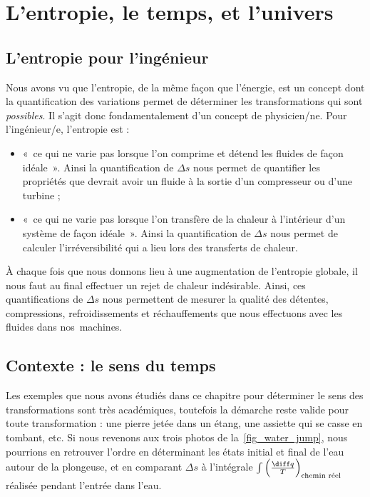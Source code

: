 \onlyframabook{\clearpage}
\section{L’entropie, le temps, et l’univers}

	\subsection{L’entropie pour l’ingénieur}

		Nous avons vu que l’entropie, de la même façon que l’énergie, est un concept dont la quantification des variations permet de déterminer les transformations qui sont \emph{possibles}. Il s’agit donc fondamentalement d’un concept de physicien/ne. Pour l’ingénieur/e, l’entropie est :
		\begin{itemize}
			\item «~ce qui ne varie pas lorsque l’on comprime et détend les fluides de façon idéale~». Ainsi la quantification de $\Delta s$ nous permet de quantifier les propriétés que devrait avoir un fluide à la sortie d’un compresseur ou d’une turbine ;
			\item «~ce qui ne varie pas lorsque l’on transfère de la chaleur à l’intérieur d’un système de façon idéale~». Ainsi la quantification de $\Delta s$ nous permet de calculer l’irréversibilité qui a lieu lors des transferts de chaleur.
		\end{itemize}

	À chaque fois que nous donnons lieu à une augmentation de l’entropie globale, il nous faut au final effectuer un rejet de chaleur indésirable. Ainsi, ces quantifications de $\Delta s$ nous permettent de mesurer la qualité des détentes, compressions, refroidissements et réchauffements que nous effectuons avec les fluides dans nos~machines.

	\subsection{Contexte : le sens du temps}
				
		Les exemples que nous avons étudiés dans ce chapitre pour déterminer le sens des transformations sont très académiques, toutefois la démarche reste valide pour toute transformation : une pierre jetée dans un étang, une assiette qui se casse en tombant, etc. Si nous revenons aux trois photos de la~\cref{fig_water_jump}, nous pourrions en retrouver l’ordre en déterminant les états initial et final de l’eau autour de la plongeuse, et en comparant $\Delta s$ à l’intégrale $\int \left(\frac{\diff q}{T}\right)_\text{chemin réel}$ réalisée pendant l’entrée dans l’eau.
		

